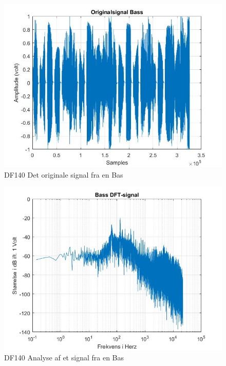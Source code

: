 \begin{figure}[H]
	\centering
	\includegraphics[width=140mm]{figures/Bass/original.jpg}
	\caption{DF140 Det originale signal fra en Bas}
	\label{fig:Bas original}
\end{figure}

\begin{figure}[H]
	\centering
	\includegraphics[width=140mm]{figures/Bass/DFT.jpg}
	\caption{DF140 Analyse af et signal fra en Bas}
	\label{fig:Bas DF140}
\end{figure}

